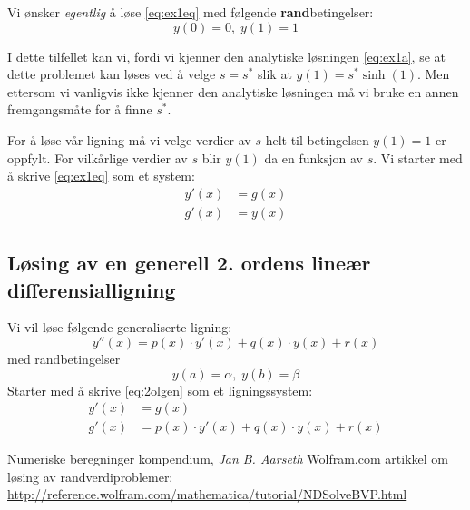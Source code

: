 \noindent Vi ønsker \emph{egentlig} å løse \eqref{eq:ex1eq} med følgende \textbf{rand}betingelser:
\begin{equation}
  y(0) = 0, \; y(1) = 1 \tag{rb}
\end{equation}

I dette tilfellet kan vi, fordi vi kjenner den analytiske løsningen \eqref{eq:ex1a}, se at dette problemet kan løses ved å velge $s=s^*$ slik at $y(1)=s^* \sinh(1)$. Men ettersom vi vanligvis ikke kjenner den analytiske løsningen må vi bruke en annen fremgangsmåte for å finne $s^*$.

For å løse vår ligning må vi velge verdier av $s$ helt til betingelsen $y(1)=1$ er oppfylt. For vilkårlige verdier av $s$ blir $y(1)$ da en funksjon av $s$. Vi starter med å skrive \eqref{eq:ex1eq} som et system:
\begin{align}
  y'(x) &= g(x) \\
  g'(x) &= y(x)
\end{align}





\subsection{Løsing av en generell 2. ordens lineær differensialligning} %
\label{sub:eksempel_l_sing_av_en_2_orden_line_r_differensialligning}
Vi vil løse følgende generaliserte ligning:
\begin{equation}
  y''(x) = p(x)\cdot y'(x) + q(x)\cdot y(x) + r(x) \label{eq:2olgen}
\end{equation}
med randbetingelser
\begin{equation}
  y(a) = \alpha, \; y(b) = \beta \tag{b}
\end{equation}
Starter med å skrive \eqref{eq:2olgen} som et ligningssystem:
\begin{align}
  y'(x) &= g(x) \\
  g'(x) &= p(x)\cdot y'(x) + q(x)\cdot y(x) + r(x)
\end{align}




\clearpage
\begin{thebibliography}{1}
   Numeriske beregninger kompendium, \emph{Jan B. Aarseth}
   Wolfram.com artikkel om løsing av randverdiproblemer: \\ \url{http://reference.wolfram.com/mathematica/tutorial/NDSolveBVP.html}
\end{thebibliography}


